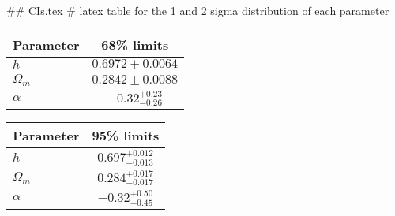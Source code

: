 ## CIs.tex
# latex table for the 1 and 2 sigma distribution of each parameter

\begin{tabular} { l  c}
 Parameter &  68\% limits\\
\hline
{\boldmath$h              $} & $0.6972\pm 0.0064          $\\
{\boldmath$\Omega_m       $} & $0.2842\pm 0.0088          $\\
{\boldmath$\alpha         $} & $-0.32^{+0.23}_{-0.26}     $\\
\hline
\end{tabular}

\begin{tabular} { l  c}
 Parameter &  95\% limits\\
\hline
{\boldmath$h              $} & $0.697^{+0.012}_{-0.013}   $\\
{\boldmath$\Omega_m       $} & $0.284^{+0.017}_{-0.017}   $\\
{\boldmath$\alpha         $} & $-0.32^{+0.50}_{-0.45}     $\\
\hline
\end{tabular}
